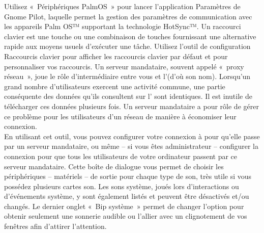 Utilisez «~Périphériques PalmOS~» pour lancer l'application Paramètres de Gnome Pilot, laquelle permet la gestion des paramètres de communication avec les appareils Palm OS™ supportant la technologie HotSync™. 
Un raccourci clavier est une touche ou une combinaison de touches fournissant une alternative rapide aux moyens usuels d'exécuter une tâche. Utilisez l'outil de configuration Raccourcis clavier pour afficher les raccourcis clavier par défaut et pour personnaliser vos raccourcis.
Un serveur mandataire, souvent appelé «~proxy réseau~», joue le rôle d'intermédiaire entre vous et l'(d'où son nom). Lorsqu'un grand nombre d'utilisateurs exercent une activité commune, une partie conséquente des données qu'ils consultent sur l' sont identiques. Il est inutile de télécharger ces données plusieurs fois. Un serveur mandataire a pour rôle de gérer ce problème pour les utilisateurs d'un réseau de manière à économiser leur connexion.\\
En utilisant cet outil, vous pouvez configurer votre connexion à  pour qu'elle passe par un serveur mandataire, ou même -- si vous êtes administrateur -- configurer la connexion pour que tous les utilisateurs de votre ordinateur passent par ce serveur mandataire.
Cette boîte de dialogue vous permet de choisir les périphériques -- matériels -- de sortie pour chaque type de son, très utile si vous possédez plusieurs cartes son. Les sons système, joués lors d'interactions ou d'événements système, y sont également listés et peuvent être désactivés et/ou changés. Le dernier onglet «~Bip système~» permet de changer l'option pour obtenir seulement une sonnerie audible ou l'allier avec un clignotement de vos fenêtres afin d'attirer l'attention. 
